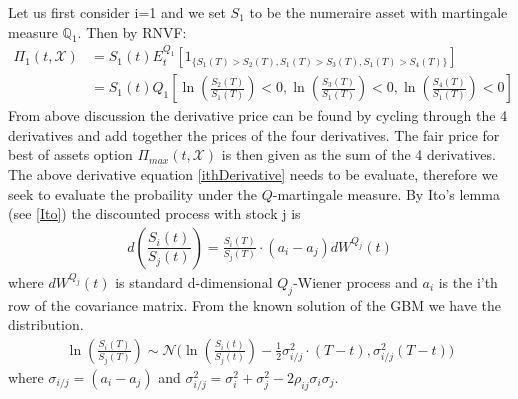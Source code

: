 Let us first consider i=1 and we set $S_1$ to be the numeraire asset with martingale measure $\mathbb{Q}_1$. Then by RNVF:
\begin{equation}\label{ithDerivative}
\begin{split}
\Pi_1(t, \mathcal{X})&=S_1(t)E_t^{Q_1}[1_{\{S_1(T)>S_2(T), S_1(T)>S_3(T), S_1(T)>S_4(T)\}}]\\
&=S_1(t) Q_1[\ln(\frac{S_2(T)}{S_1(T)})<0, \ln(\frac{S_3(T)}{S_1(T)})<0, \ln(\frac{S_4(T)}{S_1(T)})<0]
\end{split}
\end{equation}
From above discussion the derivative price can be found by cycling through the 4 derivatives and add together the prices of the four derivatives. The fair price for best of assets option $\Pi_{max}(t,\mathcal{X})$ is then given as the sum of the 4 derivatives. The above derivative equation \eqref{ithDerivative} needs to be evaluate, therefore we seek to evaluate the probaility under the $Q$-martingale measure. By Ito's lemma (see \ref{Ito}) the discounted process with stock j is
\begin{align}
d(\dfrac{S_i(t)}{S_j(t)})=\frac{S_i(T)}{S_j(T)} \cdot (a_i-a_j)dW^{Q_j}(t) 
\end{align}
where $dW^{Q_j}(t)$ is standard d-dimensional $Q_j$-Wiener process and $a_i$ is the i'th row of the covariance matrix. From the known solution of the GBM we have the distribution.
\begin{align*}
\ln(\frac{S_i(T)}{S_j(T)})\sim \mathcal{N}\bigg(\ln(\frac{S_i(t)}{S_j(t)}) - \frac{1}{2}\sigma_{i/j}^2 \cdot (T-t), \sigma_{i/j}^2 (T-t)\bigg)
\end{align*}
where $\sigma_{i/j}=(a_i-a_j)$ and $\sigma_{i/j}^2=\sigma_i^2+\sigma_j^2-2\rho_{ij}\sigma_i \sigma_j$.\\

